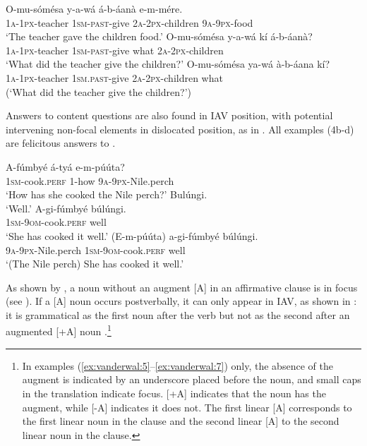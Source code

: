 \documentclass[output=paper]{langsci/langscibook}
\begin{document}
\ea\label{ex:vanderwal:3}
\ea\label{ex:vanderwal:3a}
\gll   O-mu-sómésa  y-a-wá     á-b-áanà    e-m-mére.\\
       \textsc{1a-1px}-teacher  \textsc{1sm-past}-give  \textsc{2a-2px}-children  \textsc{9a}-\textsc{9px}-food\\
\glt   ‘The teacher gave the children food.’
\ex\label{ex:vanderwal:3b}
\gll   O-mu-sómésa  y-a-wá    kí  á-b-áanà?\\
       \textsc{1a-1px}-teacher  \textsc{1sm-past}-give  what  \textsc{2a-2px}-children\\
\glt   ‘What did the teacher give the children?’
\ex\label{ex:vanderwal:3c}
\gll  *O-mu-sómésa  ya-wá      à-b-áana    kí?\\
       \textsc{1a-1px}-teacher  \textsc{1sm.past-}give  \textsc{2a-2px}-children  what\\
\glt   (‘What did the teacher give the children?’)
\z
\z

Answers to content questions are also found in IAV position, with potential intervening non-focal elements in dislocated position, as in . All examples (4b-d) are felicitous answers to .

\ea\label{ex:vanderwal:4}
\ea\label{ex:vanderwal:4a}
\gll A-fúmbyé    á-tyá    e-m-púúta?\\
       \textsc{1sm}-cook.\textsc{perf}  1-how    \textsc{9a}-\textsc{9px}-Nile.perch\\
\glt ‘How has she cooked the Nile perch?’
\ex\label{ex:vanderwal:4b}
   Bulúngi.\\
\glt  ‘Well.’
\ex\label{ex:vanderwal:4c}
\gll  A-gi-fúmbyé      búlúngi.\\
       \textsc{1sm}-\textsc{9om}-cook.\textsc{perf}  well\\
\glt   ‘She has cooked it well.’
\ex\label{ex:vanderwal:4d}
\gll  (E-m-púúta)    a-gi-fúmbyé      búlúngi.\\
       \textsc{9a}-\textsc{9px}-Nile.perch  \textsc{1sm}-\textsc{9om}-cook.\textsc{perf}  well\\
\glt   ‘(The Nile perch) She has cooked it well.’
\z
\z

As shown by \citet{HymanKatamba1993}, a  noun without an augment [A] in an affirmative clause is in focus (see ). If a [A] noun occurs postverbally, it can only appear in IAV, as shown in : it is grammatical as the first noun after the verb  but not as the second after an augmented [+A] noun .\footnote{In examples (\ref{ex:vanderwal:5}--\ref{ex:vanderwal:7}) only, the absence of the augment is indicated by an underscore placed before the noun, and small caps in the translation indicate focus. [+A] indicates that the noun has the augment, while [-A] indicates it does not.  The first linear [A] corresponds to the first linear noun in the clause and the second linear [A] to the second linear noun in the clause.} 
\end{document}
